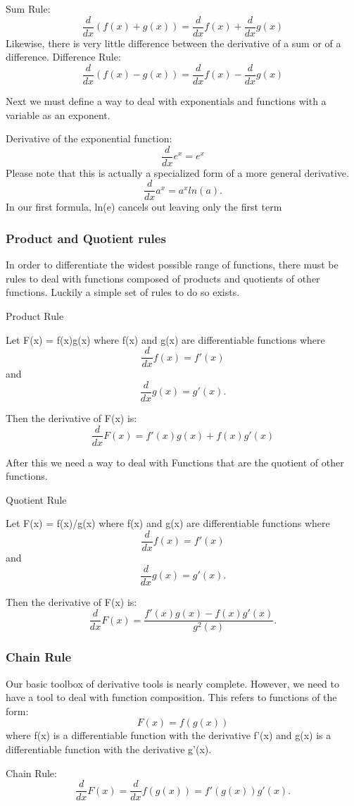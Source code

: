 \begin{theorem} Sum Rule: $$\dfrac{d}{dx}(f(x)+g(x)) = \dfrac{d}{dx}f(x) + \dfrac{d}{dx}g(x)$$
Likewise, there is very little difference between the derivative of a sum or of a difference.
Difference Rule: $$\dfrac{d}{dx}(f(x)-g(x)) = \dfrac{d}{dx}f(x) - \dfrac{d}{dx}g(x)$$
\end{theorem}

Next we must define a way to deal with exponentials and functions with a variable as an exponent.

\begin{theorem}
Derivative of the exponential function:
$$\dfrac{d}{dx}e^x = e^x $$
Please note that this is actually a specialized form of a more general derivative.
$$\dfrac{d}{dx}a^x = a^xln(a).$$
In our first formula, ln(e) cancels out leaving only the first term
\end{theorem}

\subsubsection{Product and Quotient rules}
In order to differentiate the widest possible range of functions, there must be rules to deal with functions composed of products and quotients of other functions. Luckily a simple set of rules to do so exists. 
\begin{theorem} Product Rule

Let F(x) = f(x)g(x) where f(x) and g(x) are differentiable functions where 
$$\dfrac{d}{dx}f(x) = f'(x)$$
and 
$$\dfrac{d}{dx}g(x) = g'(x).$$

Then the derivative of F(x) is:
$$\dfrac{d}{dx}F(x) = f'(x)g(x) + f(x)g'(x)$$

\end{theorem}

After this we need a way to deal with Functions that are the quotient of other functions.
\begin{theorem} Quotient Rule

Let F(x) = f(x)/g(x) where f(x) and g(x) are differentiable functions where 
$$\dfrac{d}{dx}f(x) = f'(x)$$
and 
$$\dfrac{d}{dx}g(x) = g'(x).$$

Then the derivative of F(x) is:
$$\dfrac{d}{dx}F(x) = \dfrac{f'(x)g(x) - f(x)g'(x)}{g^2(x)}.$$

\end{theorem}

\subsubsection{Chain Rule}
Our basic toolbox of derivative tools is nearly complete. However, we need to have a tool to deal with function composition. This refers to functions of the form:
$$F(x) = f(g(x))$$
where f(x) is a differentiable function with the derivative f'(x) and g(x) is a differentiable function with the derivative g'(x).
\begin{theorem} Chain Rule:
$$\dfrac{d}{dx}F(x) = \dfrac{d}{dx}f(g(x)) = f'(g(x))g'(x).$$

\end{theorem}

